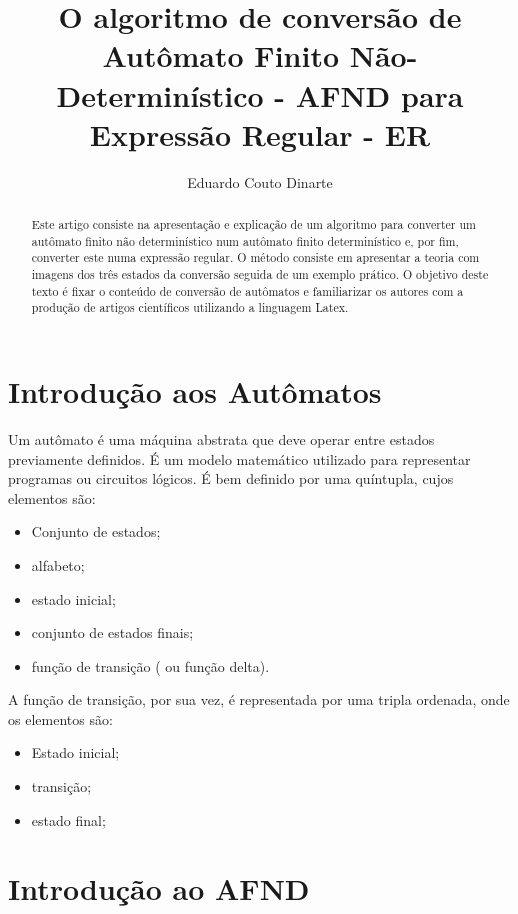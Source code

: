 \documentclass[a4paper,10pt]{article} %
\title{O algoritmo de conversão de Autômato Finito Não-Determinístico - AFND para Expressão Regular - ER}
\author{Eduardo Couto Dinarte}
\begin{document}
\maketitle

\begin{abstract}

    Este artigo consiste na apresenta\c{c}\~{a}o e explica\c{c}\~{a}o de um algoritmo para converter um aut\^{o}mato finito n\~{a}o determin\'{i}stico num aut\^{o}mato finito determin\'{i}stico e, por fim, converter este numa express\~{a}o regular. O m\'{e}todo consiste em apresentar a teoria com imagens dos tr\^{e}s estados da convers\~{a}o seguida de um exemplo pr\'{a}tico. O objetivo deste texto \'{e} fixar o conte\'{u}do de convers\~{a}o de aut\^{o}matos e familiarizar os autores com a produ\c{c}\~{a}o de artigos cient\'{i}ficos utilizando a linguagem Latex.

\end{abstract}


\section{Introdução aos Autômatos}

    Um autômato é uma máquina abstrata que deve operar entre estados previamente definidos. É um modelo matemático utilizado para representar programas ou circuitos lógicos. É bem definido por uma quíntupla, cujos elementos são:
    \begin{itemize}
        \item Conjunto de estados;
        \item alfabeto;
        \item estado inicial;
        \item conjunto de estados finais;
        \item função de transição ( ou função delta).
    \end{itemize}

A função de transição, por sua vez, é representada por uma tripla ordenada, onde os elementos são:
    \begin{itemize}
        \item Estado inicial;
        \item transição;
        \item estado final;
    \end{itemize}

\section{Introdução ao AFND}
\end{document}
